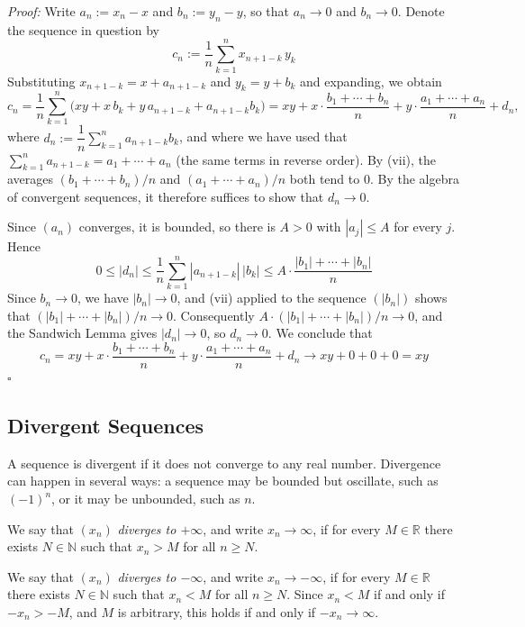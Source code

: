 \documentclass[a4paper,11pt,abstracton]{scrartcl}
\newcommand{\RR}{\mathbb{R}}
\newcommand{\NN}{\mathbb{N}}
\theoremstyle{dotlessP}
\theoremstyle{dotlessS}
\theoremstyle{remark}
\theoremstyle{definition}
\begin{document}
\begin{claim_box}
\textit{Proof:}
Write $a_n:=x_n-x$ and $b_n:=y_n-y$, so that $a_n\to0$ and $b_n\to0$. Denote the sequence in question by
\[
    c_n:=\frac1n\sum_{k=1}^nx_{n+1-k}\,y_k
\]
Substituting $x_{n+1-k}=x+a_{n+1-k}$ and $y_k=y+b_k$ and expanding, we obtain
\[
    c_n=\frac1n\sum_{k=1}^n\bigl(xy+x\,b_k+y\,a_{n+1-k}+a_{n+1-k}b_k\bigr)
    =xy+x\cdot\frac{b_1+\cdots+b_n}n+y\cdot\frac{a_1+\cdots+a_n}n+d_n,
\]
where $d_n:=\dfrac1n\sum_{k=1}^na_{n+1-k}b_k$, and where we have used that $\sum_{k=1}^na_{n+1-k}=a_1+\cdots+a_n$ (the same terms in reverse order). By (vii), the averages $(b_1+\cdots+b_n)/n$ and $(a_1+\cdots+a_n)/n$ both tend to $0$. By the algebra of convergent sequences, it therefore suffices to show that $d_n\to0$.

Since $(a_n)$ converges, it is bounded, so there is $A>0$ with $|a_j|\le A$ for every $j$. Hence
\[
    0\le|d_n|\le\frac1n\sum_{k=1}^n|a_{n+1-k}|\,|b_k|\le A\cdot\frac{|b_1|+\cdots+|b_n|}n
\]
Since $b_n\to0$, we have $|b_n|\to0$, and (vii) applied to the sequence $(|b_n|)$ shows that $(|b_1|+\cdots+|b_n|)/n\to0$. Consequently $A\cdot(|b_1|+\cdots+|b_n|)/n\to0$, and the Sandwich Lemma gives $|d_n|\to0$, so $d_n\to0$. We conclude that
\[
    c_n=xy+x\cdot\frac{b_1+\cdots+b_n}n+y\cdot\frac{a_1+\cdots+a_n}n+d_n\rightarrow xy+0+0+0=xy
\]
\hfill$\square$
\end{claim_box}

\subsection{Divergent Sequences}

A sequence is divergent if it does not converge to any real number. Divergence can happen in several ways: a sequence may be bounded but oscillate, such as $(-1)^n$, or it may be unbounded, such as $n$.

\begin{definition_box}
We say that $(x_n)$ \emph{diverges to $+\infty$}, and write $x_n\rightarrow\infty$, if for every $M\in\RR$ there exists $N\in\NN$ such that $x_n>M$ for all $n\ge N$.

We say that $(x_n)$ \emph{diverges to $-\infty$}, and write $x_n\rightarrow-\infty$, if for every $M\in\RR$ there exists $N\in\NN$ such that $x_n<M$ for all $n\ge N$. Since $x_n<M$ if and only if $-x_n>-M$, and $M$ is arbitrary, this holds if and only if $-x_n\rightarrow\infty$.
\end{definition_box}
\end{document}
